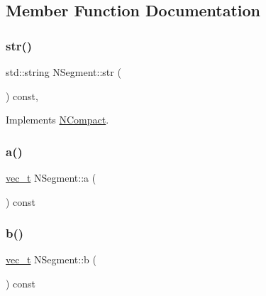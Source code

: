 \subsection{Member Function Documentation}
\mbox{\label{class_n_segment_a15514dec8420dd1aafda38e7327c9be0}} 
\subsubsection{\texorpdfstring{str()}{str()}}
{\footnotesize\ttfamily std\+::string N\+Segment\+::str (\begin{DoxyParamCaption}{ }\end{DoxyParamCaption}) const\hspace{0.3cm}{\ttfamily [override]}, {\ttfamily [virtual]}}



Implements \mbox{\hyperlink{class_n_compact_af1879d7342bf6d9902ed5473f6e89038}{N\+Compact}}.

\mbox{\label{class_n_segment_a7a4eccaa9a0746ef758efdde1bfbbd65}} 
\subsubsection{\texorpdfstring{a()}{a()}}
{\footnotesize\ttfamily \mbox{\hyperlink{_n_vector_8h_a0a2cfc67e738a3d73e4f12098c4c07f6}{vec\+\_\+t}} N\+Segment\+::a (\begin{DoxyParamCaption}{ }\end{DoxyParamCaption}) const}

\mbox{\label{class_n_segment_aa782c4870899db28cae39616edc86967}} 
\subsubsection{\texorpdfstring{b()}{b()}}
{\footnotesize\ttfamily \mbox{\hyperlink{_n_vector_8h_a0a2cfc67e738a3d73e4f12098c4c07f6}{vec\+\_\+t}} N\+Segment\+::b (\begin{DoxyParamCaption}{ }\end{DoxyParamCaption}) const}

\mbox{\label{class_n_segment_a423242ff6d7d28acbf6bb0fffb559163}} 
